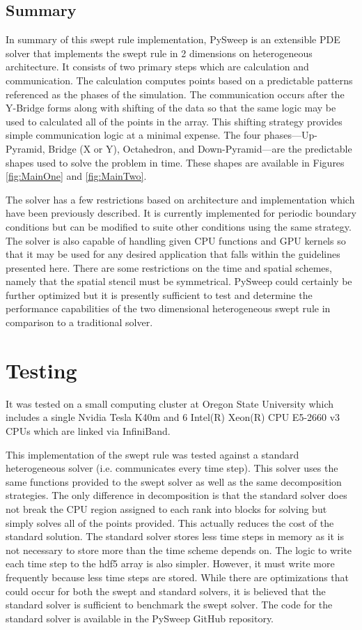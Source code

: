 \documentclass[review]{elsarticle}
\begin{document}
\subsection{Summary}
\par
In summary of this swept rule implementation, PySweep is an extensible PDE solver that implements the swept rule in 2 dimensions on heterogeneous architecture. It consists of two primary steps which are calculation and communication. The calculation computes points based on a predictable patterns referenced as the phases of the simulation. The communication occurs after the Y-Bridge forms along with shifting of the data so that the same logic may be used to calculated all of the points in the array. This shifting strategy provides simple communication logic at a minimal expense. The four phases---Up-Pyramid, Bridge (X or Y), Octahedron, and Down-Pyramid---are the predictable shapes used to solve the problem in time. These shapes are available in Figures \ref{fig:MainOne} and \ref{fig:MainTwo}. 
\par
The solver has a few restrictions based on architecture and implementation which have been previously described. It is currently implemented for periodic boundary conditions but can be modified to suite other conditions using the same strategy. The solver is also capable of handling given CPU functions and GPU kernels so that it may be used for any desired application that falls within the guidelines presented here. There are some restrictions on the time and spatial schemes, namely that the spatial stencil must be symmetrical. PySweep could certainly be further optimized but it is presently sufficient to test and determine the performance capabilities of the two dimensional heterogeneous swept rule in comparison to a traditional solver.

\section{Testing}

It was tested on a small computing cluster at Oregon State University which includes a single Nvidia Tesla K40m and 6 Intel(R) Xeon(R) CPU E5-2660 v3 CPUs which are linked via InfiniBand.

This implementation of the swept rule was tested against a standard heterogeneous solver (i.e. communicates every time step). This solver uses the same functions provided to the swept solver as well as the same decomposition strategies. The only difference in decomposition is that the standard solver does not break the CPU region assigned to each rank into blocks for solving but simply solves all of the points provided. This actually reduces the cost of the standard solution. The standard solver stores less time steps in memory as it is not necessary to store more than the time scheme depends on. The logic to write each time step to the hdf5 array is also simpler. However, it must write more frequently because less time steps are stored. While there are optimizations that could occur for both the swept and standard solvers, it is believed that the standard solver is sufficient to benchmark the swept solver. The code for the standard solver is available in the PySweep GitHub repository.
\end{document}
